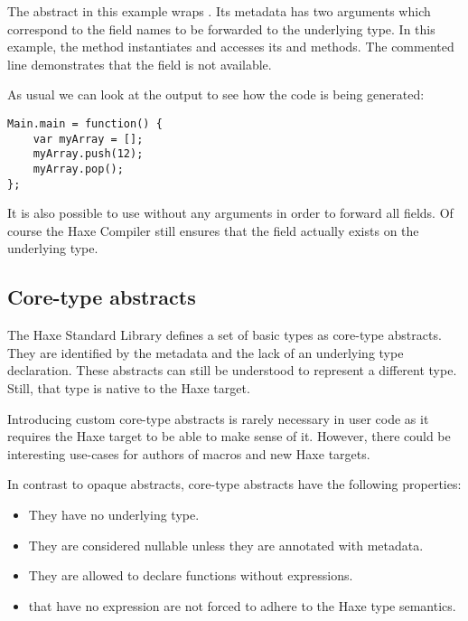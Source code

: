 {

The  abstract in this example wraps . Its  metadata has two arguments which correspond to the field names to be forwarded to the underlying type. In this example, the  method instantiates  and accesses its  and  methods. The commented line demonstrates that the  field is not available.

As usual we can look at the  output to see how the code is being generated:

\begin{lstlisting}
Main.main = function() {
	var myArray = [];
	myArray.push(12);
	myArray.pop();
};
\end{lstlisting}

It is also possible to use  without any arguments in order to forward all fields. Of course the Haxe Compiler still ensures that the field actually exists on the underlying type.



\subsection{Core-type abstracts}
\label{types-abstract-core-type}

The Haxe Standard Library defines a set of basic types as core-type abstracts. They are identified by the  metadata and the lack of an underlying type declaration. These abstracts can still be understood to represent a different type. Still, that type is native to the Haxe target. 

Introducing custom core-type abstracts is rarely necessary in user code as it requires the Haxe target to be able to make sense of it. However, there could be interesting use-cases for authors of macros and new Haxe targets.

In contrast to opaque abstracts, core-type abstracts have the following properties:

\begin{itemize}
	\item They have no underlying type.
	\item They are considered nullable unless they are annotated with  metadata.
	\item They are allowed to declare  functions without expressions.
	\item {} that have no expression are not forced to adhere to the Haxe type semantics.
\end{itemize}



}
